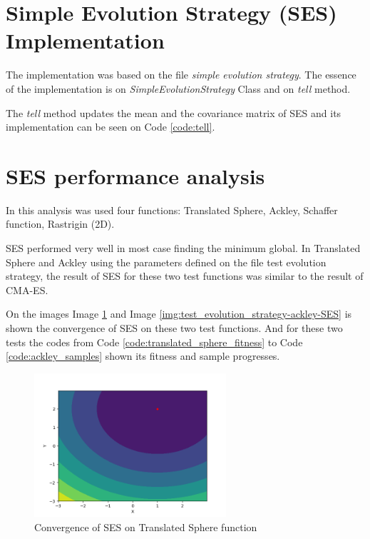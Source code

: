 \section{Simple Evolution Strategy (SES) Implementation}

The implementation was based on the file \textit{simple evolution strategy}. The essence of the implementation is on \textit{SimpleEvolutionStrategy} Class and on \textit{tell} method.

The \textit{tell} method updates the mean and the covariance matrix of SES and its implementation can be seen on Code \ref{code:tell}.



\section{SES performance analysis}

In this analysis was used four functions: Translated Sphere, Ackley, Schaffer function, Rastrigin (2D).

SES performed very well in most case finding the minimum global. In Translated Sphere and Ackley using the parameters defined on the file test evolution strategy, the result of SES for these two test functions was similar to the result of CMA-ES.

On the images Image \ref{img:test_evolution_strategy-translated_sphere-SES} and Image \ref{img:test_evolution_strategy-ackley-SES} is shown the convergence of SES on these two test functions. And for these two tests the codes from Code \ref{code:translated_sphere_fitness} to Code \ref{code:ackley_samples} shown its fitness and sample progresses.

\begin{figure}
  \begin{center}
  \includegraphics[width=2.8in]{./../code/test_evolution_strategy_results/test_evolution_strategy-translated_sphere-SES.png}
  \caption{Convergence of SES on Translated Sphere function}
  \label{img:test_evolution_strategy-translated_sphere-SES}
  \end{center}
\end{figure}

